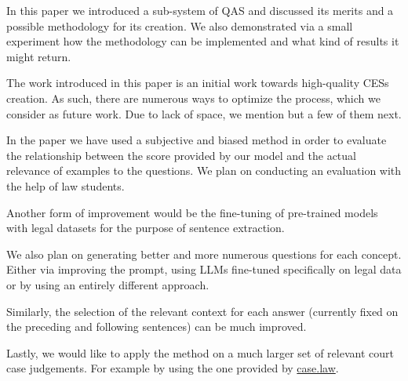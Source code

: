 In this paper we introduced a sub-system of QAS and discussed its merits and a possible methodology for its creation. We also demonstrated via a small experiment how the methodology can be implemented and what kind of results it might return.

The work introduced in this paper is an initial work towards high-quality CESs creation. As such, there are numerous ways to optimize the process, which we consider as future work. Due to lack of space, we mention but a few of them next.

In the paper we have used a subjective and biased method in order to evaluate the relationship between the score provided by our model and the actual relevance of examples to the questions. We plan on conducting an evaluation with the help of law students.

Another form of improvement would be the fine-tuning of pre-trained models with legal datasets for the purpose of sentence extraction.

We also plan on generating better and more numerous questions for each concept. Either via improving the prompt, using LLMs fine-tuned specifically on legal data or by using an entirely different approach.

Similarly, the selection of the relevant context for each answer (currently fixed on the preceding and following sentences) can be much improved.

Lastly, we would like to apply the method on a much larger set of relevant court case judgements. For example by using the one provided by \url{case.law}.